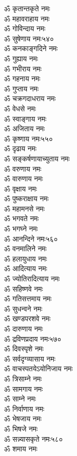 \begin{multicols}{2}
\begin{flushleft}
ॐ कृतान्तकृते नमः\\
ॐ महावराहाय नमः\\
ॐ गोविन्दाय नमः\\
ॐ सुषेणाय नमः\hfill ५४०\\
ॐ कनकाङ्गदिने नमः\\
ॐ गुह्याय नमः\\
ॐ गभीराय नमः\\
ॐ गहनाय नमः\\
ॐ गुप्ताय नमः\\
ॐ चक्रगदाधराय नमः\\
ॐ वेधसे नमः\\
ॐ स्वाङ्गाय नमः\\
ॐ अजिताय नमः\\
ॐ कृष्णाय नमः\hfill ५५०\\
ॐ दृढाय नमः\\
ॐ सङ्कर्षणायाच्युताय नमः\\
ॐ वरुणाय नमः\\
ॐ वारुणाय नमः\\
ॐ वृक्षाय नमः\\
ॐ पुष्कराक्षाय नमः\\
ॐ महामनसे नमः\\
ॐ भगवते नमः\\
ॐ भगघ्ने नमः\\
ॐ आनन्दिने नमः\hfill ५६०\\
ॐ वनमालिने नमः\\
ॐ हलायुधाय नमः\\
ॐ आदित्याय नमः\\
ॐ ज्योतिरादित्याय नमः\\
ॐ सहिष्णवे नमः\\
ॐ गतिसत्तमाय नमः\\
ॐ सुधन्वने नमः\\
ॐ खण्डपरशवे नमः\\
ॐ दारुणाय नमः\\
ॐ द्रविणप्रदाय नमः\hfill ५७०\\
ॐ दिवस्पृशे नमः\\
ॐ सर्वदृग्व्यासाय नमः\\
ॐ वाचस्पतयेऽयोनिजाय नमः\\
ॐ त्रिसाम्ने नमः\\
ॐ सामगाय नमः\\
ॐ साम्ने नमः\\
ॐ निर्वाणाय नमः\\
ॐ भेषजाय नमः\\
ॐ भिषजे नमः\\
ॐ सन्न्यासकृते नमः\hfill ५८०\\
ॐ शमाय नमः\\

\end{flushleft}
\end{multicols}

